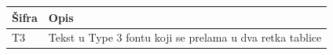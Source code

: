 \documentclass[a4paper]{article}
\begin{document}
\begin{tabular}{|l|p{5cm}|}
\hline
Šifra & Opis \\
\hline
T3 & Tekst u Type 3 fontu koji se prelama u dva retka tablice \\
\hline
\end{tabular}
\end{document}
